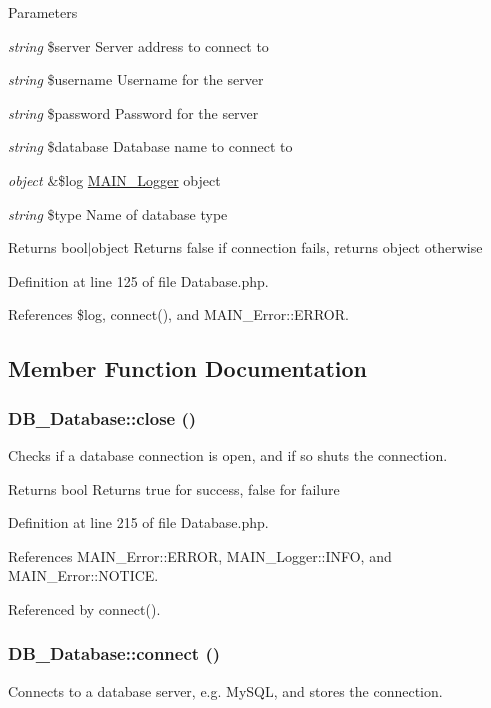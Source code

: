 \begin{DoxyParams}{Parameters}
\item[{\em string}]\$server Server address to connect to \item[{\em string}]\$username Username for the server \item[{\em string}]\$password Password for the server \item[{\em string}]\$database Database name to connect to \item[{\em object}]\&\$log \hyperlink{classMAIN__Logger}{MAIN\_\-Logger} object \item[{\em string}]\$type Name of database type\end{DoxyParams}
\begin{DoxyReturn}{Returns}
bool$|$object Returns false if connection fails, returns object otherwise 
\end{DoxyReturn}


Definition at line 125 of file Database.php.

References \$log, connect(), and MAIN\_\-Error::ERROR.

\subsection{Member Function Documentation}
\hypertarget{classDB__Database_ad8f40ab058e072bc074a9447eb8a7762}{
\subsubsection[{close}]{\setlength{\rightskip}{0pt plus 5cm}DB\_\-Database::close ()}}
\label{d3/d63/classDB__Database_ad8f40ab058e072bc074a9447eb8a7762}
Checks if a database connection is open, and if so shuts the connection.

\begin{DoxyReturn}{Returns}
bool Returns true for success, false for failure 
\end{DoxyReturn}


Definition at line 215 of file Database.php.

References MAIN\_\-Error::ERROR, MAIN\_\-Logger::INFO, and MAIN\_\-Error::NOTICE.

Referenced by connect().\hypertarget{classDB__Database_a3312e7903885b871d21a18efbe558580}{
\subsubsection[{connect}]{\setlength{\rightskip}{0pt plus 5cm}DB\_\-Database::connect ()}}
\label{d3/d63/classDB__Database_a3312e7903885b871d21a18efbe558580}
Connects to a database server, e.g. MySQL, and stores the connection.

